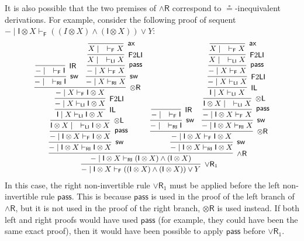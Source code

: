 \documentclass[submission,copyright,creativecommons]{eptcs}
\theoremstyle{definition}
\newcommand{\tl}{\otimes \mathsf{L}}
\newcommand{\tr}{\otimes \mathsf{R}}
\newcommand{\pass}{\mathsf{pass}}
\newcommand{\unitl}{\mathsf{IL}}
\newcommand{\unitr}{\mathsf{IR}}
\newcommand{\andr}{\land \mathsf{R}}
\newcommand{\orrone}{\lor \mathsf{R}_{1}}
\newcommand{\ax}{\mathsf{ax}}
\newcommand{\ot}{\otimes}
\newcommand{\I}{\mathsf{I}}
\newcommand{\RI}{\mathsf{RI}}
\newcommand{\LI}{\mathsf{LI}}
\newcommand{\F}{\mathsf{F}}
\newcommand{\sw}{\mathsf{sw}}
\newcommand\niccolo[1]{\mbox{}
{\marginpar{\color{red}NV}}
{\sf\noindent\color{red}#1}}%
\begin{document}
It is also possible that the two premises of $\andr$ correspond to $\circeq$-inequivalent derivations.
For example, consider the following proof of sequent $- \mid \I \ot X \vdash_\F ((I \ot X) \land (\I \ot X)) \lor Y$: %
\begin{equation*}\small
  \begin{array}{c}
    \infer[\orrone]{- \mid \I \ot X \vdash_\F ((\I \ot X) \land (\I \ot X)) \lor Y}{
      \infer[\andr]{- \mid \I \ot X \vdash_\RI (\I \ot X) \land (\I \ot X)}{
        \infer[\sw]{- \mid \I \ot X \vdash_\RI \I \ot X}{
        \infer[\pass]{- \mid \I \ot X \vdash_\F \I \ot X}{
          \infer[\tl]{\I \ot X \mid \quad \vdash_\LI \I \ot X}{
          \infer[\unitl]{\I \mid X \vdash_\LI \I \ot X}{
            \infer[\F 2 \LI]{- \mid X \vdash_\LI \I \ot X}{
            \infer[\tr]{- \mid X \vdash_\F \I \ot X}{
                \infer[\sw]{- \mid \quad \vdash_\RI \I}{
                \infer[\unitr]{- \mid \quad \vdash_\F \I}{}
              }
              &
              \infer[\sw]{- \mid X \vdash_\RI X}{
              \infer[\pass]{- \mid X \vdash_\F X}{
                \infer[\F 2 \LI]{X \mid \quad \vdash_\LI X}{
                \infer[\ax]{X \mid \quad \vdash_\F X}{}
              }
            }
          }
        }
        }}}}}
        &
        \infer[\sw]{- \mid \I \ot X \vdash_\RI \I \ot X}{
        \infer[\tr]{- \mid \I \ot X \vdash_\F \I \ot X}{
          \infer[\sw]{- \mid \quad \vdash_\RI \I}{
            \infer[\unitr]{- \mid \quad \vdash_\F \I}{}
            }
          &
          \infer[\sw]{- \mid \I \ot X \vdash_\RI X}{
          \infer[\pass]{- \mid \I \ot X \vdash_\F X}{
            \infer[\tl]{\I \ot X \mid \quad \vdash_\LI X}{
              \infer[\unitl]{\I \mid X \vdash_\LI X}{
                \infer[\F 2 \LI]{- \mid X \vdash_\LI X}{
                \infer[\pass]{- \mid X \vdash_\F X}{
                  \infer[\F 2 \LI]{X \mid \quad \vdash_\LI X}{
                  \infer[\ax]{X \mid \quad \vdash_\F X}{}
                }
              }
            }
          }
        }
      }
    }}}}}
  \end{array}
\end{equation*}
In this case, %
the right non-invertible rule $\orrone$ must be applied before the left non-invertible rule $\pass$. This is because $\pass$ is used in the proof of the left branch of $\andr$, but it is not used in the proof of the right branch, $\tr$ is used instead. If both left and right proofs would have used $\pass$ (for example, they could have been the same exact proof), then it would have been possible to apply $\pass$ before $\orrone$.
\end{document}
